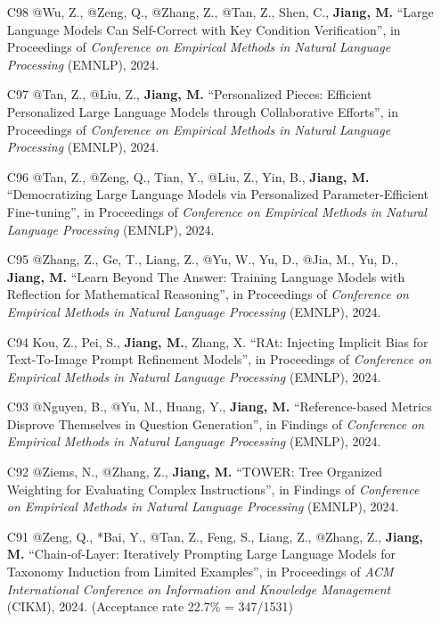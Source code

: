 \documentclass[10pt]{article}
\newenvironment{myindentpar}[1]%
{\begin{list}{}%
         {\setlength{\leftmargin}{#1}}%
         \item[]%
}
{\end{list}}
\newcounter{list}
\begin{document}
\begin{myindentpar}{0.00cm}
\begin{enumerate}[leftmargin=.5cm]
\item[C98] @Wu, Z., @Zeng, Q., @Zhang, Z., @Tan, Z., Shen, C., \textbf{Jiang, M.} ``Large Language Models Can Self-Correct with Key Condition Verification'', in Proceedings of \textit{Conference on Empirical Methods in Natural Language Processing} (EMNLP), 2024.

\item[C97] @Tan, Z., @Liu, Z., \textbf{Jiang, M.} ``Personalized Pieces: Efficient Personalized Large Language Models through Collaborative Efforts'', in Proceedings of \textit{Conference on Empirical Methods in Natural Language Processing} (EMNLP), 2024.

\item[C96] @Tan, Z., @Zeng, Q., Tian, Y., @Liu, Z., Yin, B., \textbf{Jiang, M.} ``Democratizing Large Language Models via Personalized Parameter-Efficient Fine-tuning'', in Proceedings of \textit{Conference on Empirical Methods in Natural Language Processing} (EMNLP), 2024.

\item[C95] @Zhang, Z., Ge, T., Liang, Z., @Yu, W., Yu, D., @Jia, M., Yu, D., \textbf{Jiang, M.} ``Learn Beyond The Answer: Training Language Models with Reflection for Mathematical Reasoning'', in Proceedings of \textit{Conference on Empirical Methods in Natural Language Processing} (EMNLP), 2024.

\item[C94] Kou, Z., Pei, S., \textbf{Jiang, M.}, Zhang, X. ``RAt: Injecting Implicit Bias for Text-To-Image Prompt Refinement Models'', in Proceedings of \textit{Conference on Empirical Methods in Natural Language Processing} (EMNLP), 2024.

\item[C93] @Nguyen, B., @Yu, M., Huang, Y., \textbf{Jiang, M.} ``Reference-based Metrics Disprove Themselves in Question Generation'', in Findings of \textit{Conference on Empirical Methods in Natural Language Processing} (EMNLP), 2024.

\item[C92] @Ziems, N., @Zhang, Z., \textbf{Jiang, M.} ``TOWER: Tree Organized Weighting for Evaluating Complex Instructions'', in Findings of \textit{Conference on Empirical Methods in Natural Language Processing} (EMNLP), 2024.

\item[C91] @Zeng, Q., *Bai, Y., @Tan, Z., Feng, S., Liang, Z., @Zhang, Z., \textbf{Jiang, M.} ``Chain-of-Layer: Iteratively Prompting Large Language Models for Taxonomy Induction from Limited Examples'', in Proceedings of \textit{ACM International Conference on Information and Knowledge Management} (CIKM), 2024. (Acceptance rate 22.7\% = 347/1531)


\end{enumerate}
\end{myindentpar}
\end{document}
